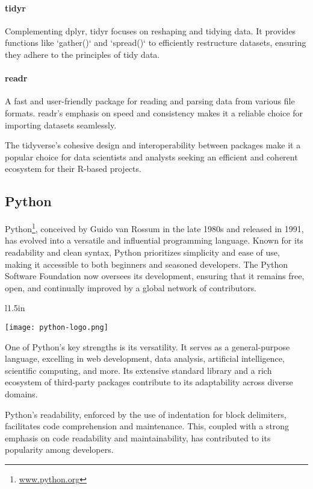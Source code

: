 \paragraph*{tidyr} Complementing dplyr, tidyr focuses on reshaping and tidying data. It provides functions like `gather()` and `spread()` to efficiently restructure datasets, ensuring they adhere to the principles of tidy data.

\paragraph*{readr} A fast and user-friendly package for reading and parsing data from various file formats. readr's emphasis on speed and consistency makes it a reliable choice for importing datasets seamlessly.

The tidyverse's cohesive design and interoperability between packages make it a popular choice for data scientists and analysts seeking an efficient and coherent ecosystem for their R-based projects.

\subsection*{Python}

Python\footnote{\url{www.python.org}}, conceived by Guido van Rossum in the late 1980s and released in 1991, has evolved into a versatile and influential programming language. Known for its readability and clean syntax, Python prioritizes simplicity and ease of use, making it accessible to both beginners and seasoned developers. The Python Software Foundation now oversees its development, ensuring that it remains free, open, and continually improved by a global network of contributors.

\begin{wrapfigure}{l}{1.5in}
\begin{center}
\texttt{[image: python-logo.png]}
\end{center}
\end{wrapfigure}

One of Python's key strengths is its versatility. It serves as a general-purpose language, excelling in web development, data analysis, artificial intelligence, scientific computing, and more. Its extensive standard library and a rich ecosystem of third-party packages contribute to its adaptability across diverse domains.

Python's readability, enforced by the use of indentation for block delimiters, facilitates code comprehension and maintenance. This, coupled with a strong emphasis on code readability and maintainability, has contributed to its popularity among developers.

